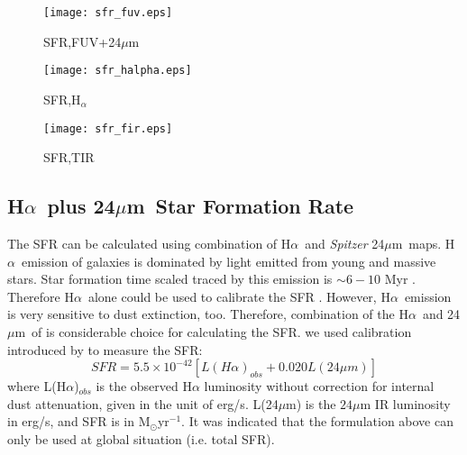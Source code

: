 \documentclass[useAMS,usenatbib]{mn2e}
\newcommand \halpha    {H$\alpha $\ }
\newcommand \um    {$\mu$m\ }
\newcommand \Spitzer {{\it Spitzer }}
\begin{document}

\begin{figure*}
    \centering
    \begin{subfigure}[b]{1\textwidth}
        \centering
        \texttt{[image: sfr\_fuv.eps]}
        \caption{SFR,FUV+24\um}
        \label{fig:sfr,fuv}
    \end{subfigure}
    \hfill
    \begin{subfigure}[b]{1\textwidth}
        \centering
        \texttt{[image: sfr\_halpha.eps]}
        \caption{SFR,H$_{\alpha}$}
        \label{fig:sfr_halpha}
    \end{subfigure}
    \hfill
    \begin{subfigure}[b]{1\textwidth}
        \centering
        \texttt{[image: sfr\_fir.eps]}
        \caption{SFR,TIR}
        \label{fig:sfr,fir}
    \end{subfigure}
    \caption{SFR map from a combination of FUV + 24\um emission (top), \halpha and 24\um emission (middle), and total infrared emission (bottom)}
    \label{fig:sfrs}
\end{figure*}

\subsection{\halpha plus 24\um Star Formation Rate}
\label{sec:sfr_halpha}

The SFR can be calculated using combination of \halpha and \Spitzer  24\um maps. \halpha emission of galaxies is dominated by light emitted from young and massive stars. Star formation time scaled traced by this emission is $\sim 6-10$ Myr \citep[e.g.,][]{Kennicutt09, Calzetti13}. Therefore \halpha alone could be used to calibrate the SFR \citep[e.g.,][]{Osterbrock06, Kennicutt09}. However, \halpha emission is very sensitive to dust extinction, too. Therefore, combination of the \halpha and 24\um of is considerable choice for calculating the SFR. we used calibration introduced by \cite{Kennicutt09} to measure the SFR:
\begin{equation}
\label{equ: halphaplus24_g}
SFR = 5.5 \times 10^{-42}[L(H{\alpha})_{obs} + 0.020L(24\mu m)]
\end{equation}
where L(H${\alpha}$)$_{obs}$ is the observed H${\alpha}$ luminosity without correction for internal dust attenuation, given in the unit of erg/s. L(24$\mu$m) is the $24\mu$m IR luminosity in erg/s, and SFR is in M$_{\odot}$yr$^{-1}$. It was indicated that the formulation above can only be used at global situation (i.e. total SFR).
\end{document}
